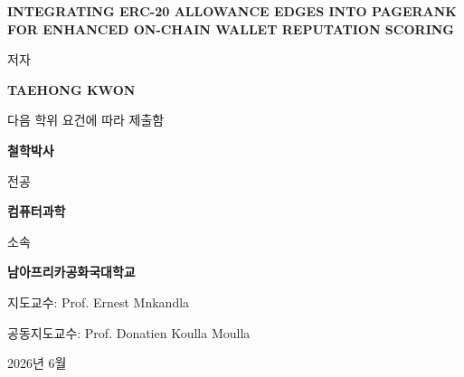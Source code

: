\begin{titlepage}
\centering
\vspace*{0.4cm}
{\Large\bfseries INTEGRATING ERC-20 ALLOWANCE EDGES INTO PAGERANK FOR ENHANCED ON-CHAIN WALLET REPUTATION SCORING\par}
\vfill
{저자\par}
\vspace{0.7cm}
{\large\bfseries TAEHONG KWON\par}
\vfill
{다음 학위 요건에 따라 제출함\par}
\vspace{0.7cm}
{\large\bfseries 철학박사\par}
\vspace{0.35cm}
{전공\par}
\vspace{0.7cm}
{\large\bfseries 컴퓨터과학\par}
\vfill
{소속\par}
\vspace{0.7cm}
{\large\bfseries 남아프리카공화국대학교\par}
\vfill
{지도교수: Prof. Ernest Mnkandla\par}
\vspace{0.35cm}
{공동지도교수: Prof. Donatien Koulla Moulla\par}
\vfill
{2026년 6월\par}
\end{titlepage}
\restoregeometry
